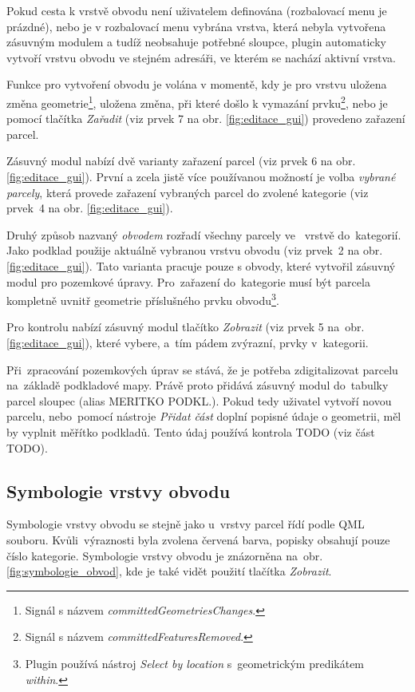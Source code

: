 Pokud cesta k vrstvě obvodu není uživatelem definována (rozbalovací menu je prázdné), nebo je v rozbalovací menu vybrána vrstva, která nebyla vytvořena zásuvným modulem a tudíž neobsahuje potřebné sloupce, plugin automaticky vytvoří vrstvu obvodu ve stejném adresáři, ve kterém se nachází aktivní  vrstva.

Funkce pro vytvoření obvodu je volána v momentě, kdy je pro vrstvu  uložena změna geometrie\footnote{Signál s názvem \textit{committedGeometriesChanges}.}, uložena změna, při které došlo k vymazání prvku\footnote{Signál s názvem \textit{committedFeaturesRemoved}.}, nebo je pomocí tlačítka \textit{Zařadit} (viz prvek 7 na obr. \ref{fig:editace_gui}) provedeno zařazení parcel.

Zásuvný modul nabízí dvě varianty zařazení parcel (viz prvek 6 na obr. \ref{fig:editace_gui}). První a zcela jistě více používanou možností je volba \textit{vybrané parcely}, která provede zařazení vybraných parcel do zvolené kategorie (viz prvek~4 na obr. \ref{fig:editace_gui}).

Druhý způsob nazvaný \textit{obvodem} rozřadí všechny parcely ve~ vrstvě do~kategorií. Jako podklad použije aktuálně vybranou vrstvu obvodu (viz prvek~2 na obr. \ref{fig:editace_gui}). Tato varianta pracuje pouze s obvody, které vytvořil zásuvný modul pro pozemkové úpravy. Pro~zařazení do~kategorie musí být parcela kompletně uvnitř geometrie příslušného prvku obvodu\footnote{Plugin používá nástroj \textit{Select by location} s~geometrickým predikátem \textit{within}.}.

Pro kontrolu nabízí zásuvný modul tlačítko \textit{Zobrazit} (viz prvek 5 na~obr. \ref{fig:editace_gui}), které vybere, a~tím pádem zvýrazní, prvky v~kategorii.

Při~zpracování pozemkových úprav se stává, že je potřeba zdigitalizovat parcelu na~základě podkladové mapy. Právě proto přidává zásuvný modul do~tabulky parcel sloupec  (alias MERITKO PODKL.). Pokud tedy uživatel vytvoří novou parcelu, nebo~pomocí nástroje \textit{Přidat část} doplní popisné údaje o geometrii, měl by vyplnit měřítko podkladů. Tento údaj používá kontrola TODO (viz část TODO).

\subsection{Symbologie vrstvy obvodu}
\label{symbologie_obvod}

Symbologie vrstvy obvodu se stejně jako u~vrstvy parcel řídí podle QML souboru. Kvůli~výraznosti byla zvolena červená barva, popisky obsahují pouze číslo kategorie. Symbologie vrstvy obvodu je znázorněna na~obr. \ref{fig:symbologie_obvod}, kde je také vidět použití tlačítka \textit{Zobrazit}.


